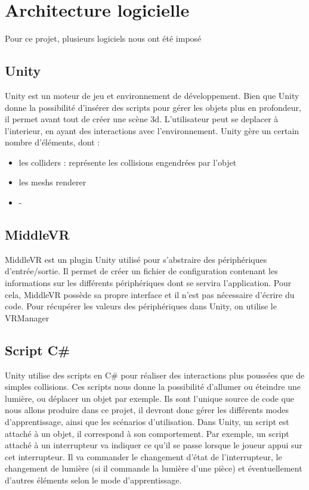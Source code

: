 \section{Architecture logicielle}
Pour ce projet, plusieurs logiciels nous ont été imposé

\subsection{Unity}
Unity est un moteur de jeu et environnement de développement. Bien que Unity donne la possibilité d'insérer des scripts pour gérer les objets plus en profondeur, il permet avant tout de créer une scène 3d. L'utilisateur peut se deplacer à l'interieur, en ayant des interactions avec l'environnement. Unity gère un certain nombre d'éléments, dont :
\begin{itemize}
        \item les colliders : représente les collisions engendrées par l'objet
        \item les meshs renderer
        \item -
\end{itemize}


\subsection{MiddleVR}
MiddleVR est un plugin Unity utilisé pour s'abstraire des périphériques d'entrée/sortie. Il permet de créer un fichier de configuration contenant les informations sur les différents périphériques dont se servira l'application. Pour cela, MiddleVR possède sa propre interface et il n'est pas nécessaire d'écrire du code.
Pour récupérer les valeurs des périphériques dans Unity, on utilise le VRManager

\subsection{Script C\#}
Unity utilise des scripts en C\# pour réaliser des interactions plus poussées que de simples collisions. Ces scripts nous donne la possibilité d'allumer ou éteindre une lumière, ou déplacer un objet par exemple. Ils sont l'unique source de code que nous allons produire dans ce projet, il devront donc gérer les différents modes d'apprentissage, ainsi que les scénarios d'utilisation.
Dans Unity, un script est attaché à un objet, il correspond à son comportement. Par exemple, un script attaché à un interrupteur va indiquer ce qu'il se passe lorsque le joueur appui sur cet interrupteur. Il va commander le changement d'état de l'interrupteur, le changement de lumière (si il commande la lumière d'une pièce) et éventuellement d'autres éléments selon le mode d'apprentissage.
